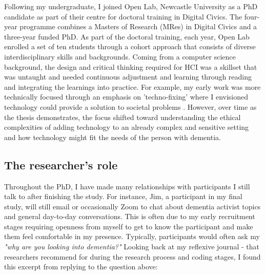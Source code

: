 Following my undergraduate, I joined Open Lab, Newcastle University as a PhD candidate as part of their centre for doctoral training in Digital Civics. The four-year programme combines a Masters of Research (MRes) in Digital Civics and a three-year funded PhD. As part of the doctoral training, each year, Open Lab enrolled a set of ten students through a cohort approach that consists of diverse interdisciplinary skills and backgrounds. Coming from a computer science background, the design and critical thinking required for HCI was a skillset that was untaught and needed continuous adjustment and learning through reading and integrating the learnings into practice. For example, my early work was more technically focused through an emphasis on 'techno-fixing' where I envisioned technology could provide a solution to societal problems \citep{jongsma2017usual}. However, over time as the thesis demonstrates, the focus shifted toward understanding the ethical complexities of adding technology to an already complex and sensitive setting and how technology might fit the needs of the person with dementia.

\subsection{The researcher's role}
\label{Reflexivity:Questions}
Throughout the PhD, I have made many relationships with participants I still talk to after finishing the study. For instance, Jim, a participant in my final study, will still email or occasionally Zoom to chat about dementia activist topics and general day-to-day conversations. This is often due to my early recruitment stages requiring openness from myself to get to know the participant and make them feel comfortable in my presence. Typically, participants would often ask my \textit{"why are you looking into dementia?"} Looking back at my reflexive journal - that researchers recommend for during the research process and coding stages, I found this excerpt from  replying to the question above:

